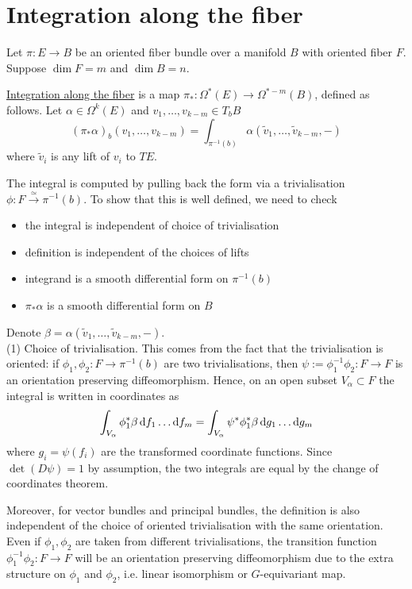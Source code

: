 \section{Integration along the fiber} \label{section:fiber_integration}
Let $\pi: E\to B$ be an oriented fiber bundle over a manifold $B$ with oriented
fiber $F$. Suppose $\dim F = m$ and $\dim B = n$.
\begin{defn}
	\underline{Integration along the fiber} is a map $\pi_* : \Omega^*(E)\to
	\Omega^{*-m}(B)$, defined as follows. Let $\alpha\in \Omega^k(E)$ and
	$v_1,\ldots,v_{k-m} \in T_bB$ 
	\[
	(\pi_*\alpha)_b(v_1,\ldots,v_{k-m}) = \int_{\pi^{-1}(b)}
	\alpha(\widetilde{v}_1,\ldots,\widetilde{v}_{k-m},-)
	\] 
	where $\widetilde{v}_i$ is any lift of $v_i$ to $TE$. 
\end{defn}
The integral is computed by pulling back the form via a trivialisation $\phi 
:F \xrightarrow{\simeq} \pi^{-1}(b)$. 
To show that this is well defined, we need to check 
\begin{itemize}
	\item the integral is independent of choice of trivialisation
	\item definition is independent of the choices of lifts
	\item integrand is a smooth differential form on $\pi^{-1}(b)$
	\item $\pi_*\alpha$ is a smooth differential form on $B$
\end{itemize}
Denote $\beta = \alpha(\widetilde{v}_1,\ldots,\widetilde{v}_{k-m},-)$.\\
(1) Choice of trivialisation. This comes from the fact that the trivialisation
is oriented: if $\phi_1,\phi_2 : F \to \pi^{-1}(b)$ are two trivialisations,
then $\psi:=\phi_1^{-1}\phi_2 : F \to F$ is an orientation preserving diffeomorphism. 
Hence, on an open subset $V_\alpha \subset F$ the integral is written in
coordinates as  
\[
\int_{V_{\alpha}} \phi_1^*\beta \odif{f_1}\ldots\odif{f_m} 
= \int_{V_\alpha} \psi^*\phi_1^*\beta  \odif{g_1}\ldots\odif{g_m}
\] 
where $g_i = \psi(f_i)$ are the transformed coordinate functions. Since
$\det(D\psi)=1$ by assumption, the two integrals are equal by the change of 
coordinates theorem. 

Moreover, for vector bundles and principal bundles, the definition is also 
independent of the choice of oriented trivialisation with the same orientation. 
Even if $\phi_1,\phi_2$ are taken from different trivialisations, the
transition function $\phi_1^{-1}\phi_2: F \to F$ will be an orientation
preserving diffeomorphism due to the extra structure on $\phi_1$ and
$\phi_2$, i.e. linear isomorphism or $G$-equivariant map. 

